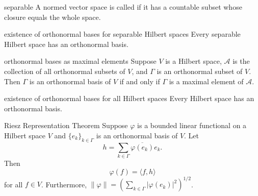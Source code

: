 \documentclass[../main.tex]{subfiles}
\begin{document}
\begin{definition}{separable}{}
A normed vector space is called  if it has a countable subset whose closure equals the whole space.
\end{definition}

\begin{theorem}{existence of orthonormal bases for separable Hilbert spaces}{}
Every separable Hilbert space has an orthonormal basis.
\end{theorem}

\begin{theorem}{orthonormal bases as maximal elements}{}
Suppose $V$ is a Hilbert space, $\mathcal{A}$ is the collection of all orthonormal subsets of $V$, and $\Gamma$ is an orthonormal subset of $V$. Then $\Gamma$ is an orthonormal basis of $V$ if and only if $\Gamma$ is a maximal element of $\mathcal{A}$.
\end{theorem}

\begin{theorem}{existence of orthonormal bases for all Hilbert spaces}{}
Every Hilbert space has an orthonormal basis.
\end{theorem}

\begin{theorem}{Riesz Representation Theorem}{}
Suppose $\varphi$ is a bounded linear functional on a Hilbert space $V$ and $\{e_k\}_{k \in \Gamma}$ is an orthonormal basis of $V$. Let
\[
h = \sum_{k \in \Gamma} \overline{\varphi(e_k)} e_k.
\]
Then
\[
\varphi(f) = \langle f, h \rangle
\]
for all $f \in V$. Furthermore, $\|\varphi\| = \left(\sum_{k \in \Gamma}|\varphi(e_k)|^2\right)^{1/2}$.
\end{theorem}
\end{document}
